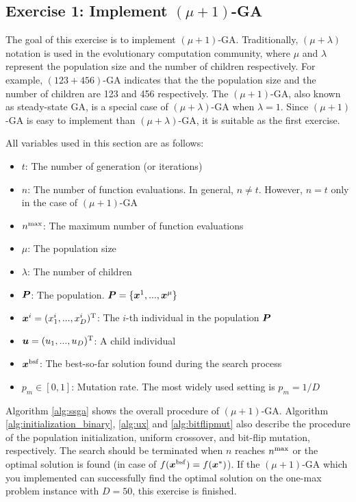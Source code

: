 \documentclass[11pt]{article}
\def\vector#1{\mbox{\boldmath $#1$}}
\def\vector#1{\mbox{\boldmath $#1$}}
\begin{document}
\subsection{Exercise 1: Implement $(\mu + 1)$-GA}

The goal of this exercise is to implement $(\mu + 1)$-GA.
Traditionally, $(\mu + \lambda)$ notation is used in the evolutionary computation community, where $\mu$ and $\lambda$ represent the population size and the number of children respectively.
For example, $(123 + 456)$-GA indicates that the the population size and the number of children are 123 and 456 respectively.
The $(\mu + 1)$-GA, also known as steady-state GA, is a special case of $(\mu + \lambda)$-GA when $\lambda = 1$.
Since $(\mu + 1)$-GA is easy to implement than $(\mu + \lambda)$-GA, it is suitable as the first exercise.

All variables used in this section are as follows:
%
\begin{itemize}
\item $t$: The number of generation (or iterations)
\item $n$: The number of function evaluations. In general, $n \neq t$. However, $n = t$ only in the case of $(\mu + 1)$-GA
\item $n^{{\rm max}}$: The maximum number of function evaluations
\item $\mu$: The population size
\item $\lambda$: The number of children
\item $\vector{P}$: The population. $\vector{P} = \{\vector{x}^1, ..., \vector{x}^{\mu} \}$
\item $\vector{x}^{i} = (x^{i} _1, ..., x^{i}_D)^{\rm T}$: The $i$-th individual in the population $\vector{P}$
\item $\vector{u} = (u_1, ..., u_D)^{\rm T}$: A child individual
\item  $\vector{x}^{\rm bsf}$: The best-so-far solution found during the search process
\item $p_m \in [0,1]$: Mutation rate. The most widely used setting is $p_m = 1/D$
\end{itemize}

Algorithm \ref{alg:ssga} shows the overall procedure of $(\mu + 1)$-GA.
Algorithm \ref{alg:initialization_binary}, \ref{alg:ux} and \ref{alg:bitflipmut} also describe the procedure of the population initialization, uniform crossover, and bit-flip mutation, respectively.
The search should be terminated when $n$ reaches $n^{{\rm max}}$ or the optimal solution is found (in case of $f(\vector{x}^{\rm bsf}) = f(\vector{x}^*)$).
If the $(\mu + 1)$-GA which you implemented can successfully find the optimal solution on the one-max problem instance with $D=50$, this exercise is finished.
\end{document}
